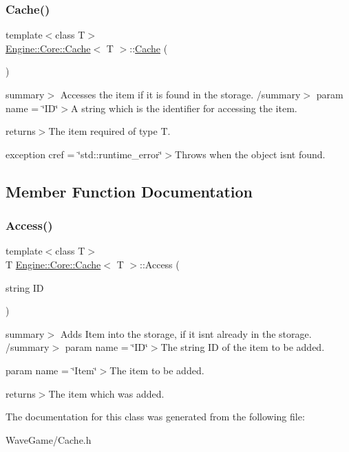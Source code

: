 \subsubsection{\texorpdfstring{Cache()}{Cache()}}
{\footnotesize\ttfamily template$<$class T$>$ \\
\hyperlink{class_engine_1_1_core_1_1_cache}{Engine\+::\+Core\+::\+Cache}$<$ T $>$\+::\hyperlink{class_engine_1_1_core_1_1_cache}{Cache} (\begin{DoxyParamCaption}{ }\end{DoxyParamCaption})\hspace{0.3cm}{\ttfamily [inline]}}

summary$>$ Accesses the item if it is found in the storage. /summary$>$ param name = \char`\"{}\+I\+D\char`\"{}$>$A string which is the identifier for accessing the item.

returns$>$The item required of type T.

exception cref = \char`\"{}std\+::runtime\+\_\+error\char`\"{}$>$Throws when the object isn\textquotesingle{}t found.

\subsection{Member Function Documentation}
\mbox{\label{class_engine_1_1_core_1_1_cache_a1a4d83ac2cc8656acb5c99e4999e1551}} 
\subsubsection{\texorpdfstring{Access()}{Access()}}
{\footnotesize\ttfamily template$<$class T$>$ \\
T \hyperlink{class_engine_1_1_core_1_1_cache}{Engine\+::\+Core\+::\+Cache}$<$ T $>$\+::Access (\begin{DoxyParamCaption}\item[{string}]{ID }\end{DoxyParamCaption})\hspace{0.3cm}{\ttfamily [inline]}}

summary$>$ Adds Item into the storage, if it isn\textquotesingle{}t already in the storage. /summary$>$ param name = \char`\"{}\+I\+D\char`\"{}$>$The string ID of the item to be added.

param name = \char`\"{}\+Item\char`\"{}$>$The item to be added.

returns$>$The item which was added.

The documentation for this class was generated from the following file\+:\begin{DoxyCompactItemize}
\item 
Wave\+Game/Cache.\+h\end{DoxyCompactItemize}
